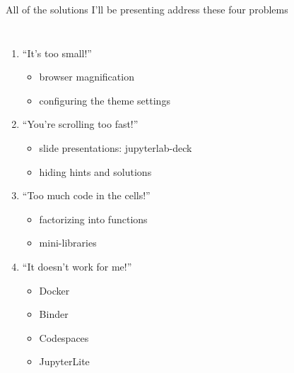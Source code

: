 \documentclass[aspectratio=169]{beamer}
\begin{document}
\begin{frame}{All of the solutions I'll be presenting address these four problems}
\Large
\vspace{0.5 cm}
\begin{columns}
\begin{enumerate}\setlength{\itemsep}{0.35 cm}
\item ``It's too small!''
\begin{itemize}
\item<2-> browser magnification
\item<2-> configuring the theme settings
\end{itemize}

\item ``You're scrolling too fast!''
\begin{itemize}
\item<2-> slide presentations: jupyterlab-deck
\item<2-> hiding hints and solutions
\end{itemize}

\item ``Too much code in the cells!''
\begin{itemize}
\item<2-> factorizing into functions
\item<2-> mini-libraries
\end{itemize}

\item ``It doesn't work for me!''
\begin{itemize}
\item<2-> Docker
\item<2-> Binder
\item<2-> Codespaces
\item<2-> JupyterLite
\end{itemize}
\end{enumerate}
\end{columns}
\end{frame}
\end{document}
